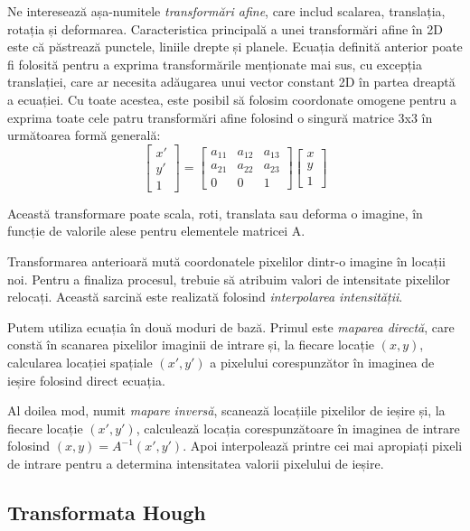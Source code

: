 Ne interesează așa-numitele \textit{transformări afine}, care includ scalarea, translația, rotația și deformarea. Caracteristica principală a unei transformări afine în 2D este că păstrează punctele, liniile drepte și planele. Ecuația definită anterior poate fi folosită pentru a exprima transformările menționate mai sus, cu excepția translației, care ar necesita adăugarea unui vector constant 2D în partea dreaptă a ecuației. Cu toate acestea, este posibil să folosim coordonate omogene pentru a exprima toate cele patru transformări afine folosind o singură matrice 3x3 în următoarea formă generală:
\[
    \begin{bmatrix}
        x' \\
        y' \\
        1
    \end{bmatrix}
    =
    \begin{bmatrix}
        a_{11} & a_{12} & a_{13} \\
        a_{21} & a_{22} & a_{23} \\
        0      & 0      & 1
    \end{bmatrix}
    \begin{bmatrix}
        x \\
        y \\
        1
    \end{bmatrix}
\]

Această transformare poate scala, roti, translata sau deforma o imagine, în funcție de valorile alese pentru elementele matricei A.

Transformarea anterioară mută coordonatele pixelilor dintr-o imagine în locații noi. Pentru a finaliza procesul, trebuie să atribuim valori de intensitate pixelilor relocați. Această sarcină este realizată folosind \textit{interpolarea intensității}.

Putem utiliza ecuația în două moduri de bază. Primul este \textit{maparea directă}, care constă în scanarea pixelilor imaginii de intrare și, la fiecare locație $(x, y)$, calcularea locației spațiale $(x', y')$ a pixelului corespunzător în imaginea de ieșire folosind direct ecuația.

Al doilea mod, numit \textit{mapare inversă}, scanează locațiile pixelilor de ieșire și, la fiecare locație $(x', y')$, calculează locația corespunzătoare în imaginea de intrare folosind $(x, y) = A^{-1}(x', y')$. Apoi interpolează printre cei mai apropiați pixeli de intrare pentru a determina intensitatea valorii pixelului de ieșire.

\subsection*{Transformata Hough}

